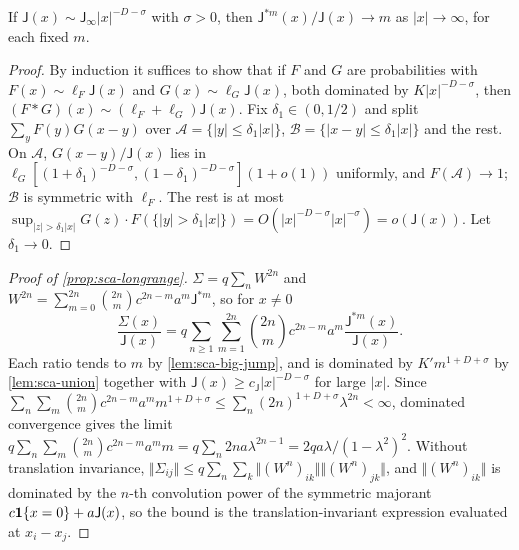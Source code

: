 \begin{lemma}\label{lem:sca-big-jump}
If $\mathsf J(x)\sim\mathsf J_\infty|x|^{-D-\sigma}$ with $\sigma>0$, then $\mathsf J^{\ast m}(x)/\mathsf J(x)\to m$ as $|x|\to\infty$, for each fixed $m$.
\end{lemma}
\begin{proof}
By induction it suffices to show that if $F$ and $G$ are probabilities with $F(x)\sim\ell_F\mathsf J(x)$ and $G(x)\sim\ell_G\mathsf J(x)$, both dominated by $K|x|^{-D-\sigma}$, then $(F\ast G)(x)\sim(\ell_F+\ell_G)\mathsf J(x)$. Fix $\delta_1\in(0,1/2)$ and split $\sum_yF(y)G(x-y)$ over $\mathcal A=\{|y|\le\delta_1|x|\}$, $\mathcal B=\{|x-y|\le\delta_1|x|\}$ and the rest. On $\mathcal A$, $G(x-y)/\mathsf J(x)$ lies in $\ell_G[(1+\delta_1)^{-D-\sigma},(1-\delta_1)^{-D-\sigma}](1+o(1))$ uniformly, and $F(\mathcal A)\to1$; $\mathcal B$ is symmetric with $\ell_F$. The rest is at most $\sup_{|z|>\delta_1|x|}G(z)\cdot F(\{|y|>\delta_1|x|\})=O(|x|^{-D-\sigma}|x|^{-\sigma})=o(\mathsf J(x))$. Let $\delta_1\to0$.
\end{proof}

\begin{proof}[Proof of \cref{prop:sca-longrange}]
$\Sigma=q\sum_nW^{2n}$ and $W^{2n}=\sum_{m=0}^{2n}\binom{2n}mc^{2n-m}a^m\mathsf J^{\ast m}$, so for $x\neq0$
\begin{equation*}
\frac{\Sigma(x)}{\mathsf J(x)}=q\sum_{n\ge1}\sum_{m=1}^{2n}\binom{2n}mc^{2n-m}a^m\frac{\mathsf J^{\ast m}(x)}{\mathsf J(x)}.
\end{equation*}
Each ratio tends to $m$ by \cref{lem:sca-big-jump}, and is dominated by $K'm^{1+D+\sigma}$ by \cref{lem:sca-union} together with $\mathsf J(x)\ge c_{\mathsf J}|x|^{-D-\sigma}$ for large $|x|$. Since $\sum_n\sum_m\binom{2n}mc^{2n-m}a^mm^{1+D+\sigma}\le\sum_n(2n)^{1+D+\sigma}\lambda^{2n}<\infty$, dominated convergence gives the limit $q\sum_n\sum_m\binom{2n}mc^{2n-m}a^mm=q\sum_n2na\lambda^{2n-1}=2qa\lambda/(1-\lambda^2)^2$. Without translation invariance, $\Vert\Sigma_{ij}\Vert\le q\sum_n\sum_k\Vert(W^n)_{ik}\Vert\Vert(W^n)_{jk}\Vert$, and $\Vert(W^n)_{ik}\Vert$ is dominated by the $n$-th convolution power of the symmetric majorant $c\mathbf{1}\{x=0\}+a\mathsf J(x)$, so the bound is the translation-invariant expression evaluated at $x_i-x_j$.
\end{proof}

